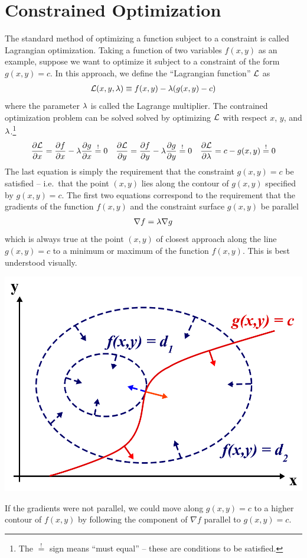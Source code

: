 \documentclass[11pt]{article}
\numberwithin{equation}{section}
\begin{document}
\section{Constrained Optimization}\label{app:constrained-optimization}
The standard method of optimizing a function subject to a constraint is called Lagrangian optimization.
Taking a function of two variables $f(x,y)$ as an example, suppose we want to optimize it subject to a constraint of the form $g(x,y)=c$.
In this approach, we define the ``Lagrangian function'' $\mathcal{L}$ as
\begin{align}
	\mathcal{L}(x,y,\lambda )
\equiv
	f(x,y)
-
	\lambda (g(x,y)-c)
\end{align}
where the parameter $\lambda $ is called the Lagrange multiplier.
The contrained optimization problem can be solved solved by optimizing $\mathcal{L}$ with respect $x$, $y$, and $\lambda $.\footnote{The $\overset{!}=$ sign means ``must equal'' -- these are conditions to be satisfied.}
\begin{align*}
	\frac {\partial\mathcal{L}}{\partial x}
=
	\frac {\partial f}{\partial x}
-
	\lambda \frac {\partial g}{\partial x}
\overset{!}=0
&&
	\frac {\partial\mathcal{L}}{\partial y}
=
	\frac {\partial f}{\partial y}
-
	\lambda \frac {\partial g}{\partial y}
\overset{!}=0
&&
	\frac {\partial\mathcal{L}}{\partial\lambda }
=
	c
-
	g(x,y)
\overset{!}=0
\end{align*}
The last equation is simply the requirement that the constraint $g(x,y)=c$ be satisfied -- i.e.\ that the point $(x,y)$ lies along the contour of $g(x,y)$ specified by $g(x,y)=c$.
The first two equations correspond to the requirement that the gradients of the function $f(x,y)$ and the constraint surface $g(x,y)$ be parallel
\begin{align}
	\nabla f
=
	\lambda \nabla g
\end{align}
which is always true at the point $(x,y)$ of closest approach along the line $g(x,y)=c$ to a minimum or maximum of the function $f(x,y)$.
This is best understood visually.
\begin{center}
	\includegraphics[width=0.5\linewidth]{figs/lagrangian-optimization.png}
\end{center}
If the gradients were not parallel, we could move along $g(x,y)=c$ to a higher contour of $f(x,y)$ by following the component of $\nabla f$ parallel to $g(x,y)=c$.
\end{document}

